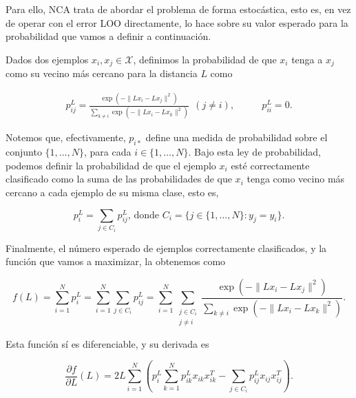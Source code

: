 Para ello, NCA trata de abordar el problema de forma estocástica, esto es, en vez de operar con el error LOO directamente, lo hace sobre su valor esperado para la probabilidad que vamos a definir a continuación.

Dados dos ejemplos $x_i, x_j \in \mathcal{X}$, definimos la probabilidad de que $x_i$ tenga a $x_j$ como su vecino más cercano para la distancia $L$ como

\begin{equation}
    \begin{split}
    p_{ij}^L = \frac{\exp\left( - \|Lx_i - Lx_j \|^2 \right)}{\sum\limits_{k \ne i} \exp\left(-\|Lx_i - Lx_k \|^2\right)}\ \ (j \ne i),  
    \end{split}
    \quad\quad
    \begin{split}
    p_{ii}^L = 0.
    \end{split}
\end{equation}

Notemos que, efectivamente, $p_{i*}$ define una medida de probabilidad sobre el conjunto $\{1,\dots,N\}$, para cada $i \in \{1,\dots,N\}$. Bajo esta ley de probabilidad, podemos definir la probabilidad de que el ejemplo $x_i$ esté correctamente clasificado como la suma de las probabilidades de que $x_i$ tenga como vecino más cercano a cada ejemplo de su misma clase, esto es,

\begin{equation}
    p_i^L = \sum_{j \in C_i} p_{ij}^L \text{, donde } C_i = \{j \in \{1,\dots,N\}\colon y_j = y_i\}.
\end{equation}

Finalmente, el número esperado de ejemplos correctamente clasificados, y la función que vamos a maximizar, la obtenemos como

\begin{equation}
    f(L) = \sum_{i=1}^N p_i^L = \sum_{i=1}^N \sum_{j \in C_i} p_{ij}^L = \sum_{i=1}^N \sum_{\substack{j \in C_i \\ j \ne i}} \frac{\exp\left(-\|Lx_i - Lx_j \|^2\right)}{\sum\limits_{k \ne i} \exp\left( -\|Lx_i - Lx_k\|^2 \right)}.
\end{equation}

Esta función sí es diferenciable, y su derivada es

\begin{equation}
    \frac{\partial f}{\partial L}(L) = 2L \sum_{i=1}^N \left( p_i^L \sum_{k=1}^N p_{ik}^L x_{ik}x_{ik}^T - \sum_{j \in C_i} p_{ij}^Lx_{ij}x_{ij}^T \right).
\end{equation}

